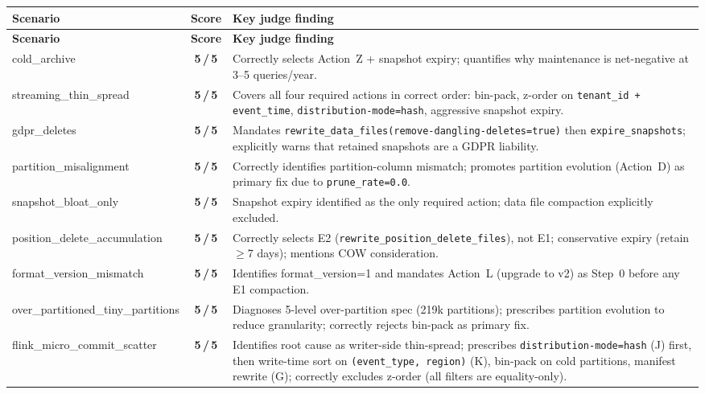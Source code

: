 \documentclass[11pt,a4paper]{article}
\newcommand{\score}[1]{\textbf{#1\,/\,5}}
\newcommand{\code}[1]{\texttt{#1}}
\begin{document}
\begin{longtable}{lcp{7.5cm}}
\toprule
\textbf{Scenario} & \textbf{Score} & \textbf{Key judge finding} \\
\midrule
\endfirsthead
\toprule
\textbf{Scenario} & \textbf{Score} & \textbf{Key judge finding} \\
\midrule
\endhead
\bottomrule
\endfoot

cold\_archive           & \score{5} & Correctly selects Action~Z + snapshot expiry; quantifies why maintenance is net-negative at 3--5 queries/year. \\[3pt]
streaming\_thin\_spread & \score{5} & Covers all four required actions in correct order: bin-pack, z-order on \code{tenant\_id + event\_time}, \code{distribution-mode=hash}, aggressive snapshot expiry. \\[3pt]
gdpr\_deletes           & \score{5} & Mandates \code{rewrite\_data\_files(remove-dangling-deletes=true)} then \code{expire\_snapshots}; explicitly warns that retained snapshots are a GDPR liability. \\[3pt]
partition\_misalignment & \score{5} & Correctly identifies partition-column mismatch; promotes partition evolution (Action~D) as primary fix due to \code{prune\_rate=0.0}. \\[3pt]
snapshot\_bloat\_only   & \score{5} & Snapshot expiry identified as the only required action; data file compaction explicitly excluded. \\[3pt]
\midrule
position\_delete\_accumulation    & \score{5} & Correctly selects E2 (\code{rewrite\_position\_delete\_files}), not E1; conservative expiry (retain $\geq$7 days); mentions COW consideration. \\[3pt]
format\_version\_mismatch         & \score{5} & Identifies format\_version=1 and mandates Action~L (upgrade to v2) as Step~0 before any E1 compaction. \\[3pt]
over\_partitioned\_tiny\_partitions & \score{5} & Diagnoses 5-level over-partition spec (219k partitions); prescribes partition evolution to reduce granularity; correctly rejects bin-pack as primary fix. \\[3pt]
flink\_micro\_commit\_scatter     & \score{5} & Identifies root cause as writer-side thin-spread; prescribes \code{distribution-mode=hash} (J) first, then write-time sort on \code{(event\_type, region)} (K), bin-pack on cold partitions, manifest rewrite (G); correctly excludes z-order (all filters are equality-only). \\[3pt]

\end{longtable}
\end{document}
